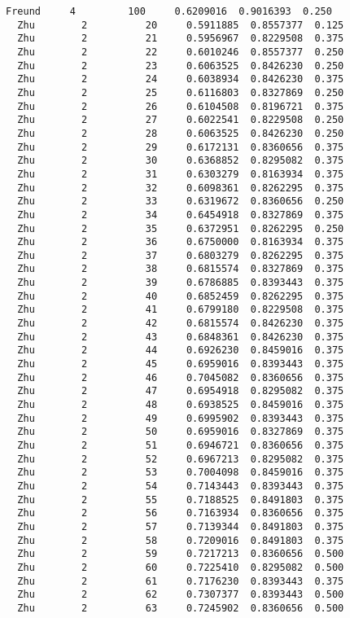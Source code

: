 \documentclass[11pt]{article}
\begin{document}
\begin{Verbatim}[commandchars=\\\{\}]
  Freund     4         100     0.6209016  0.9016393  0.250
  Zhu        2          20     0.5911885  0.8557377  0.125
  Zhu        2          21     0.5956967  0.8229508  0.375
  Zhu        2          22     0.6010246  0.8557377  0.250
  Zhu        2          23     0.6063525  0.8426230  0.250
  Zhu        2          24     0.6038934  0.8426230  0.375
  Zhu        2          25     0.6116803  0.8327869  0.250
  Zhu        2          26     0.6104508  0.8196721  0.375
  Zhu        2          27     0.6022541  0.8229508  0.250
  Zhu        2          28     0.6063525  0.8426230  0.250
  Zhu        2          29     0.6172131  0.8360656  0.375
  Zhu        2          30     0.6368852  0.8295082  0.375
  Zhu        2          31     0.6303279  0.8163934  0.375
  Zhu        2          32     0.6098361  0.8262295  0.375
  Zhu        2          33     0.6319672  0.8360656  0.250
  Zhu        2          34     0.6454918  0.8327869  0.375
  Zhu        2          35     0.6372951  0.8262295  0.250
  Zhu        2          36     0.6750000  0.8163934  0.375
  Zhu        2          37     0.6803279  0.8262295  0.375
  Zhu        2          38     0.6815574  0.8327869  0.375
  Zhu        2          39     0.6786885  0.8393443  0.375
  Zhu        2          40     0.6852459  0.8262295  0.375
  Zhu        2          41     0.6799180  0.8229508  0.375
  Zhu        2          42     0.6815574  0.8426230  0.375
  Zhu        2          43     0.6848361  0.8426230  0.375
  Zhu        2          44     0.6926230  0.8459016  0.375
  Zhu        2          45     0.6959016  0.8393443  0.375
  Zhu        2          46     0.7045082  0.8360656  0.375
  Zhu        2          47     0.6954918  0.8295082  0.375
  Zhu        2          48     0.6938525  0.8459016  0.375
  Zhu        2          49     0.6995902  0.8393443  0.375
  Zhu        2          50     0.6959016  0.8327869  0.375
  Zhu        2          51     0.6946721  0.8360656  0.375
  Zhu        2          52     0.6967213  0.8295082  0.375
  Zhu        2          53     0.7004098  0.8459016  0.375
  Zhu        2          54     0.7143443  0.8393443  0.375
  Zhu        2          55     0.7188525  0.8491803  0.375
  Zhu        2          56     0.7163934  0.8360656  0.375
  Zhu        2          57     0.7139344  0.8491803  0.375
  Zhu        2          58     0.7209016  0.8491803  0.375
  Zhu        2          59     0.7217213  0.8360656  0.500
  Zhu        2          60     0.7225410  0.8295082  0.500
  Zhu        2          61     0.7176230  0.8393443  0.375
  Zhu        2          62     0.7307377  0.8393443  0.500
  Zhu        2          63     0.7245902  0.8360656  0.500

\end{Verbatim}
\end{document}
